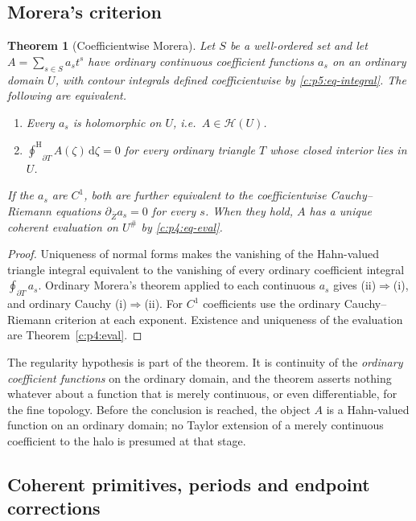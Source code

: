 \documentclass[11pt,a4paper]{article}
\numberwithin{equation}{section}
\newtheorem{theorem}{Theorem}[section]
\theoremstyle{definition}
\theoremstyle{remark}
\theoremstyle{plain}
\newcommand{\tm}{t}
\newcommand{\halo}[1]{#1^{\#}}
\newcommand{\Hc}{\mathcal H}
\newcommand{\ointH}{{\oint^{\mathrm H}}}
\newcommand{\dd}{\mathrm d}
\begin{document}
\subsection{Morera's criterion}
\label{c:p5:morerasec}

\begin{theorem}[Coefficientwise Morera]\label{c:p5:morera}
Let $S$ be a well-ordered set and let $A=\sum_{s\in S}a_s\tm^{s}$ have
\emph{ordinary continuous} coefficient functions $a_s$ on an ordinary
domain $U$, with contour integrals defined coefficientwise by
\eqref{c:p5:eq-integral}. The following are equivalent.
\begin{enumerate}[label=(\roman*)]
\item Every $a_s$ is holomorphic on $U$, i.e.\ $A\in\Hc(U)$.
\item $\ointH_{\partial T}A(\zeta)\,\dd\zeta=0$ for every ordinary
triangle $T$ whose closed interior lies in $U$.
\end{enumerate}
If the $a_s$ are $C^{1}$, both are further equivalent to the
coefficientwise Cauchy--Riemann equations
$\partial_{\bar Z}a_s=0$ for every $s$. When they hold, $A$ has a unique
coherent evaluation on $\halo U$ by \eqref{c:p4:eq-eval}.
\end{theorem}

\begin{proof}
Uniqueness of normal forms makes the vanishing of the Hahn-valued
triangle integral equivalent to the vanishing of every ordinary
coefficient integral $\oint_{\partial T}a_s$. Ordinary Morera's theorem
applied to each continuous $a_s$ gives (ii)$\Rightarrow$(i), and
ordinary Cauchy (i)$\Rightarrow$(ii). For $C^{1}$ coefficients use the
ordinary Cauchy--Riemann criterion at each exponent. Existence and
uniqueness of the evaluation are Theorem~\ref{c:p4:eval}.
\end{proof}

The regularity hypothesis is part of the theorem. It is continuity of
the \emph{ordinary coefficient functions} on the ordinary domain, and
the theorem asserts nothing whatever about a function that is merely
continuous, or even differentiable, for the fine topology. Before the
conclusion is reached, the object $A$ is a Hahn-valued function on an
ordinary domain; no Taylor extension of a merely continuous coefficient
to the halo is presumed at that stage.

\subsection{Coherent primitives, periods and endpoint corrections}
\label{c:p5:primsec}
\end{document}
